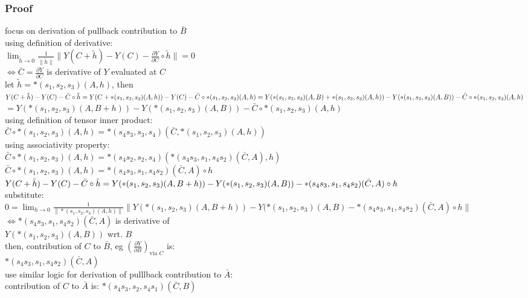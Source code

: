\documentclass[8pt]{extarticle}
\begin{document}
\begin{multicols*}{2}
  \subsubsection{Proof}
  focus on derivation of pullback contribution to $\bar{B}$\\
  using definition of derivative:\\
  $\lim_{\tilde{h} \rightarrow 0} \frac{1}{\|\tilde{h}\|} \|Y(C+\tilde{h}) - Y(C) - \frac{\partial Y}{\partial C} \circ \tilde{h}\| = 0$\\
  $\iff \bar{C} = \frac{\partial Y}{\partial C}$ is derivative of $Y$ evaluated at $C$\\

  let $\tilde{h} = *(s_1, s_2, s_3)(A, h)$, then\\
  $Y(C+\tilde{h}) - Y(C) - \bar{C} \circ \tilde{h}\\
  = Y(C+*(s_1, s_2, s_3)(A,h)) - Y(C) - \bar{C} \circ *(s_1, s_2, s_3)(A,h)\\
  = Y(*(s_1,s_2,s_3)(A,B) + *(s_1, s_2, s_3)(A,h)) - Y(*(s_1,s_2,s_3)(A,B)) - \bar{C} \circ *(s_1, s_2, s_3)(A,h)$\\
  $= Y(*(s_1,s_2,s_3)(A,B+h)) - Y(*(s_1,s_2,s_3)(A,B)) - \bar{C} \circ *(s_1, s_2, s_3)(A,h)$\\

  using definition of tensor inner product:\\
  $\bar{C} \circ *(s_1, s_2, s_3)(A,h) = *(s_4 s_3, s_3, s_4)(\bar{C}, *(s_1, s_2, s_3)(A,h))$\\

  using associativity property:\\
  $\bar{C} \circ *(s_1, s_2, s_3)(A,h) = *(s_4 s_2, s_2, s_4)(*(s_4 s_3, s_1, s_4 s_2)(\bar{C}, A), h)$\\
  $\bar{C} \circ *(s_1, s_2, s_3)(A,h) = *(s_4 s_3, s_1, s_4 s_2)(\bar{C}, A) \circ h$\\

  $Y(C+\tilde{h}) - Y(C) - \bar{C} \circ \tilde{h}\\
  = Y(*(s_1,s_2,s_3)(A,B+h)) - Y(*(s_1,s_2,s_3)(A,B))\\
  - *(s_4 s_3, s_1, s_4 s_2)(\bar{C}, A) \circ h$\\

  substitute:\\
  $0=\lim_{h\rightarrow 0} \frac{1}{\|*(s_1, s_2, s_3)(A,h)\|} \|Y(*(s_1, s_2,s _3)(A,B+h)) - Y(*(s_1,s_2,s_3)(A,B) - *(s_4 s_3, s_1, s_4 s_2)(\bar{C}, A) \circ h\|$\\
  $\iff *(s_4 s_3, s_1, s_4 s_2)(\bar{C}, A)$ is derivative of\\ $Y(*(s_1, s_2, s_3)(A, B))$ wrt. $B$\\
  then, contribution of $C$ to $\bar{B}$, eg $(\frac{\partial Y}{\partial B})_{\text{via } C}$ is:\\ $*(s_4 s_3, s_1, s_4 s_2)(\bar{C}, A)$\\

  use similar logic for derivation of pulllback contribution to $\bar{A}$:\\
  contribution of $C$ to $\bar{A}$ is: $*(s_4 s_3, s_2, s_4 s_1)(\bar{C}, B)$

  \vfill\null
  \columnbreak
    
\end{multicols*}
\end{document}
